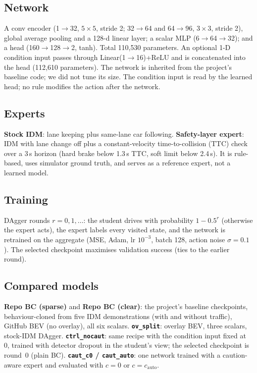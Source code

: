 \documentclass[conference]{IEEEtran}
\newcommand{\ovs}{\texttt{ov\_split}}
\newcommand{\ctrl}{\texttt{ctrl\_nocaut}}
\newcommand{\cautc}{\texttt{caut\_c0}}
\newcommand{\cauta}{\texttt{caut\_auto}}
\begin{document}
\subsection{Network}
A conv encoder (1$\to$32, $5{\times}5$, stride 2; 32$\to$64 and 64$\to$96, $3{\times}3$, stride 2), global average pooling and a 128-d linear layer; a scalar MLP (6$\to$64$\to$32); and a head (160$\to$128$\to$2, tanh). Total 110{,}530 parameters. An optional 1-D condition input passes through Linear(1$\to$16)+ReLU and is concatenated into the head (112{,}610 parameters). The network is inherited from the project's baseline code; we did not tune its size. The condition input is read by the learned head; no rule modifies the action after the network.

\subsection{Experts}
\textbf{Stock IDM}: lane keeping plus same-lane car following. \textbf{Safety-layer expert}: IDM with lane change off plus a constant-velocity time-to-collision (TTC) check over a 3\,s horizon (hard brake below 1.3\,s TTC, soft limit below 2.4\,s). It is rule-based, uses simulator ground truth, and serves as a reference expert, not a learned model.

\subsection{Training}
DAgger rounds $r=0,1,\dots$: the student drives with probability $1-0.5^r$ (otherwise the expert acts), the expert labels every visited state, and the network is retrained on the aggregate (MSE, Adam, lr $10^{-3}$, batch 128, action noise $\sigma=0.1$). The selected checkpoint maximises validation success (ties to the earlier round).

\subsection{Compared models}
\textbf{Repo BC (sparse)} and \textbf{Repo BC (clear)}: the project's baseline checkpoints, behaviour-cloned from five IDM demonstrations (with and without traffic), GitHub BEV (no overlay), all six scalars. \textbf{\ovs}: overlay BEV, three scalars, stock-IDM DAgger. \textbf{\ctrl}: same recipe with the condition input fixed at 0, trained with detector dropout in the student's view; the selected checkpoint is round~0 (plain BC). \textbf{\cautc{} / \cauta}: one network trained with a caution-aware expert and evaluated with $c{=}0$ or $c{=}c_\text{auto}$.
\end{document}
